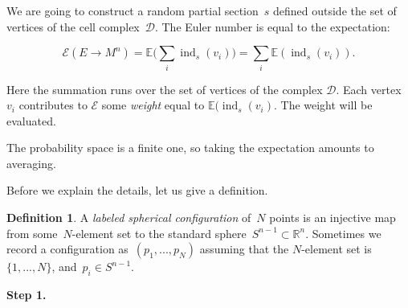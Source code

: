 \documentclass[12pt]{amsart}
\theoremstyle{plain}
\theoremstyle{definition}
\newtheorem{definition}{Definition}
\theoremstyle{plain}
\theoremstyle{definition}
\DeclareMathOperator{\ind}{ind}
\begin{document}
We are going to construct a random partial section~$s$ defined outside the set of vertices of the cell complex~${\mathcal{D}}$. 
The Euler number is equal to the expectation:
	
	\begin{equation}\label{exp}
	  \mathcal{E}(E\rightarrow M^n)=\mathbb{E}\Big(\sum_i \ind_s(v_i)\Big)= \sum_i \mathbb{E}(\ind_s(v_i)).
	\end{equation}

Here the summation runs over the set of vertices of the complex $\mathcal{D}$.
	Each vertex $v_i$ contributes to $\mathcal{E}$ some \textit{weight} equal to  $\mathbb{E}(\ind_s(v_i)$. The weight will be evaluated.
 
The probability space  {is} a finite one, so taking the expectation  { amounts} to averaging.

 
 
 \bigskip
 
 

 
   Before we explain the details, let us give a definition.
    
    
\begin{definition}
A  \textit{labeled spherical configuration} of~$N$ points is an injective map  from some~$N$-element set to the standard sphere~$S^{n-1}\subset \mathbb{R}^n$.   Sometimes we  record  a configuration as~$(p_1,...,p_N)$ assuming that the $N$-element set is $\{1,...,N\}$, and~$p_i\in S^{n-1}$.


  
\end{definition}
  
  
\textbf{
Step 1.}

\end{document}
